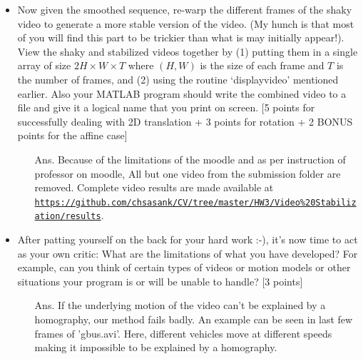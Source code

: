 \documentclass[11pt]{article}
\begin{document}
\begin{enumerate}
\begin{itemize}
\item Now given the smoothed sequence, re-warp the different frames of the shaky video to generate a more stable version of the video. (My hunch is that most of you will find this part to be trickier than what is may initially appear!). View the shaky and stabilized videos together by (1) putting them in a single array of size $2H \times W \times T$ where $(H,W)$ is the size of each frame and $T$ is the number of frames, and (2) using the routine `displayvideo' mentioned earlier.  Also your MATLAB program should write the combined video to a file and give it a logical name that you print on screen. \textsf{[5 points for successfully dealing with 2D translation + 3 points for rotation + 2 BONUS points for the affine case]}
\begin{itemize}
	\item[Ans.] Because of the limitations of the moodle and as per instruction of professor on moodle, All but one video from the submission folder are removed.
Complete video results are made available at 
\href{https://github.com/chsasank/CV/tree/master/HW3/Video\%20Stabilization/results}{\texttt{https://github.com/chsasank/CV/tree/master/HW3/Video\%20Stabilization/results}}.	
\end{itemize}
	
\item After patting yourself on the back for your hard work :-), it's now time to act as your own critic: What are the limitations of what you have developed? For example, can you think of certain types of videos or motion models or other situations your program is or will be unable to handle? \textsf{[3 points]}

\begin{itemize}
	\item[Ans.] If the underlying motion of the video can't be explained by a homography, our method fails badly. An example can be seen in last few frames of 'gbus.avi'. Here, different vehicles move at different speeds making it impossible to be explained by a homography.
\end{itemize}

\end{itemize}


\end{enumerate}
\end{document}

